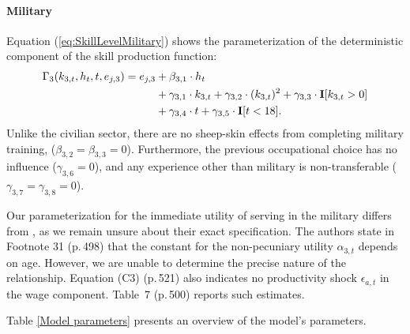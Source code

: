 \paragraph{Military}
Equation (\ref{eq:SkillLevelMilitary}) shows the parameterization of the deterministic component of the skill production function:
%
\begin{align}\label{eq:SkillLevelMilitary}
    \Gamma_3( k_{3,t}, h_t, t, e_{j,3}) = e_{j,3} & + \beta_{3,1} \cdot h_t  \\\nonumber
	               \nonumber &+ \gamma_{3,1} \cdot  k_{3,t} + \gamma_{3,2} \cdot (k_{3,t})^2 + \gamma_{3,3} \cdot {\textbf{I}}[k_{3,t} > 0]\\\nonumber
									 & + \gamma_{3,4} \cdot t + \gamma_{3,5} \cdot {\textbf{I}}[t < 18].
\end{align}
%
Unlike the civilian sector, there are no sheep-skin effects from completing military training, ($\beta_{3,2} = \beta_{3,3}= 0$). Furthermore, the previous occupational choice has no influence ($\gamma_{3,6}= 0$), and any experience other than military is non-transferable ($\gamma_{3,7} = \gamma_{3,8} = 0$).

\begin{Remark} Our parameterization for the immediate utility of serving in the military differs from , as we remain unsure about their exact specification. The authors state in Footnote 31 (p.\,498) that the constant for the non-pecuniary utility $\alpha_{3,t}$ depends on age. However, we are unable to determine the precise nature of the relationship. Equation (C3) (p.\,521) also indicates no productivity shock $\epsilon_{a,t}$ in the wage component. Table~7 (p.\,500) reports such estimates.
\end{Remark}

\noindent Table \ref{Model parameters} presents an overview of the model's parameters.


